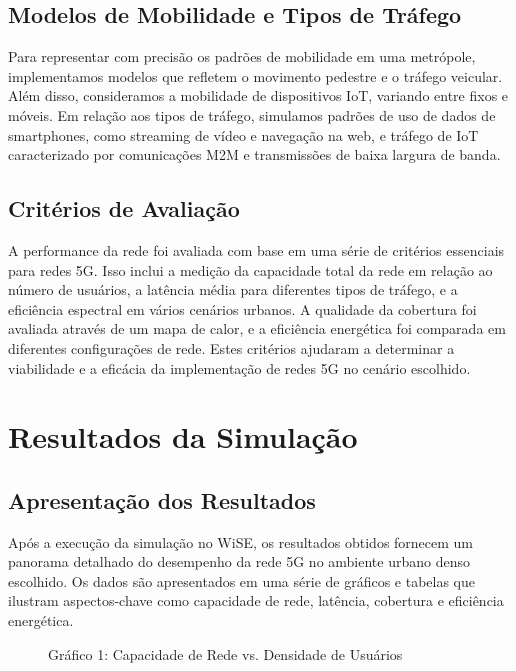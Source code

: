 \documentclass[journal]{IEEEtran}
\begin{document}
\subsection{Modelos de Mobilidade e Tipos de Tráfego}

Para representar com precisão os padrões de mobilidade em uma metrópole, implementamos modelos que refletem o movimento pedestre e o tráfego veicular. Além disso, consideramos a mobilidade de dispositivos IoT, variando entre fixos e móveis. Em relação aos tipos de tráfego, simulamos padrões de uso de dados de smartphones, como streaming de vídeo e navegação na web, e tráfego de IoT caracterizado por comunicações M2M e transmissões de baixa largura de banda.

\subsection{Critérios de Avaliação}

A performance da rede foi avaliada com base em uma série de critérios essenciais para redes 5G. Isso inclui a medição da capacidade total da rede em relação ao número de usuários, a latência média para diferentes tipos de tráfego, e a eficiência espectral em vários cenários urbanos. A qualidade da cobertura foi avaliada através de um mapa de calor, e a eficiência energética foi comparada em diferentes configurações de rede. Estes critérios ajudaram a determinar a viabilidade e a eficácia da implementação de redes 5G no cenário escolhido.

\section{Resultados da Simulação}

\subsection{Apresentação dos Resultados}

Após a execução da simulação no WiSE, os resultados obtidos fornecem um panorama detalhado do desempenho da rede 5G no ambiente urbano denso escolhido. Os dados são apresentados em uma série de gráficos e tabelas que ilustram aspectos-chave como capacidade de rede, latência, cobertura e eficiência energética.

\begin{figure}[htbp]
  \centering
  \caption{Gráfico 1: Capacidade de Rede vs. Densidade de Usuários}
\end{figure}
\end{document}
